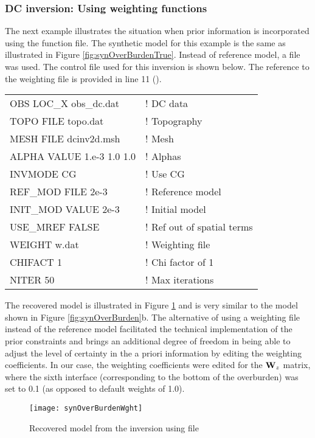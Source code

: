 \subsubsection{DC inversion: Using weighting functions}
The next example illustrates the situation when prior information is incorporated using the  function file. The synthetic model for this example is the same as illustrated in Figure \ref{fig:synOverBurdenTrue}. Instead of reference model, a  file was used. The control file used for this inversion is shown below. The reference to the weighting file is provided in line 11 ().
%
\begin{fileExample}
\begin{tabular}{|ll|}
\hline
OBS LOC\_X obs\_dc.dat & ! DC data \\
TOPO FILE topo.dat & ! Topography\\
MESH FILE dcinv2d.msh & ! Mesh \\
ALPHA VALUE 1.e-3 1.0 1.0 & ! Alphas \\
INVMODE CG & ! Use CG \\
REF\_MOD FILE 2e-3 & ! Reference model \\
INIT\_MOD VALUE 2e-3 & ! Initial model \\
USE\_MREF FALSE & ! Ref out of spatial terms  \\
WEIGHT w.dat & ! Weighting file \\
CHIFACT 1 & ! Chi factor of 1 \\
NITER 50 & ! Max iterations \\
\hline
\end{tabular}
\end{fileExample}

The recovered model is illustrated in Figure \ref{fig:synOverBurdenWght} and is very similar to the model shown in Figure \ref{fig:synOverBurden}b. The alternative of using a weighting file instead of the reference model facilitated the technical implementation of the prior constraints and brings an additional degree of freedom in being able to adjust the level of certainty in the a priori information by editing the weighting coefficients. In our case, the weighting coefficients were edited for the $\mathbf{W}_z$ matrix, where the sixth interface (corresponding to the bottom of the overburden) was set to 0.1 (as opposed to default weights of 1.0).	
%
\begin{figure}
\centering
\texttt{[image: synOverBurdenWght]}
\caption{Recovered model from the inversion using  file}
\label{fig:synOverBurdenWght}
\end{figure}

